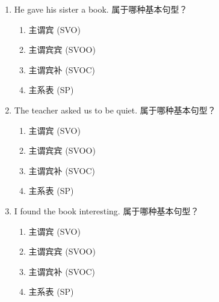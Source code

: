 \documentclass[11pt,a4paper]{ctexart}
\begin{document}
\begin{enumerate}[leftmargin=*,itemsep=4pt]
\begin{enumerate}[label=\Alph*.,leftmargin=2em,itemsep=1pt,topsep=2pt]
\item 主谓宾宾 (SVOO)
\item 主谓宾补 (SVOC)
\item 主系表 (SP)
\end{enumerate}
\item He gave his sister a book. 属于哪种基本句型？
\begin{enumerate}[label=\Alph*.,leftmargin=2em,itemsep=1pt,topsep=2pt]
\item 主谓宾 (SVO)
\item 主谓宾宾 (SVOO)
\item 主谓宾补 (SVOC)
\item 主系表 (SP)
\end{enumerate}
\item The teacher asked us to be quiet. 属于哪种基本句型？
\begin{enumerate}[label=\Alph*.,leftmargin=2em,itemsep=1pt,topsep=2pt]
\item 主谓宾 (SVO)
\item 主谓宾宾 (SVOO)
\item 主谓宾补 (SVOC)
\item 主系表 (SP)
\end{enumerate}
\item I found the book interesting. 属于哪种基本句型？
\begin{enumerate}[label=\Alph*.,leftmargin=2em,itemsep=1pt,topsep=2pt]
\item 主谓宾 (SVO)
\item 主谓宾宾 (SVOO)
\item 主谓宾补 (SVOC)
\item 主系表 (SP)
\end{enumerate}
\end{enumerate}
\end{document}
